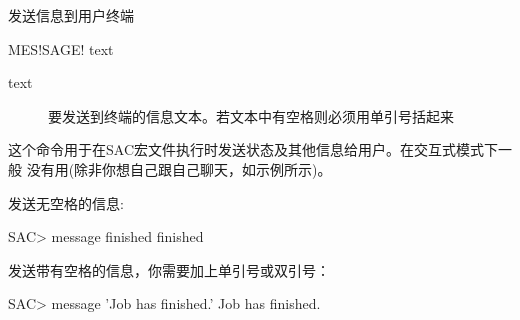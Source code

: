 \label{cmd:message}

发送信息到用户终端

\begin{SACSTX}
MES!SAGE! text
\end{SACSTX}

\begin{description}
\item [text] 要发送到终端的信息文本。若文本中有空格则必须用单引号括起来
\end{description}

这个命令用于在SAC宏文件执行时发送状态及其他信息给用户。在交互式模式下一般
没有用(除非你想自己跟自己聊天，如示例所示)。

发送无空格的信息:
\begin{SACCode}
SAC> message finished
 finished
\end{SACCode}

发送带有空格的信息，你需要加上单引号或双引号：
\begin{SACCode}
SAC> message 'Job has finished.'
 Job has finished.
\end{SACCode}
